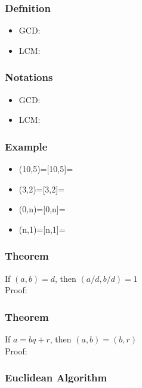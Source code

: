 \documentclass{article}
\begin{document}
\subsubsection{Defnition}
\begin{itemize}
    \item GCD:
    \item LCM:
\end{itemize}
\subsubsection{Notations}
\begin{itemize}
    \item GCD:
    \item LCM:
\end{itemize}

\subsubsection{Example}
\begin{itemize}
    \item (10,5)=\hspace{74px}[10,5]=
    \item (3,2)=\hspace{80px}[3,2]=
    \item (0,n)=\hspace{80px}[0,n]=
    \item (n,1)=\hspace{80px}[n,1]=
\end{itemize}

\subsubsection{Theorem}

If $(a,b)=d$, then $(a/d,b/d)=1$\\
Proof:
\vspace{40px}

\subsubsection{Theorem}

If $a=bq+r$, then $(a,b)=(b,r)$\\
Proof:
\vspace{40px}

\subsubsection{Euclidean Algorithm}
\pagebreak
\end{document}
